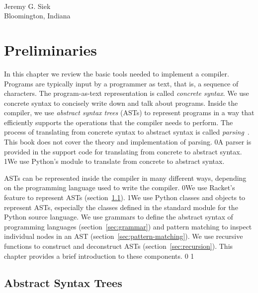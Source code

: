 \documentclass[7x10]{TimesAPriori_MIT}%
\def\racketEd{0}
\def\pythonEd{1}
\def\edition{0}
\newcommand{\racket}[1]{{\if\edition\racketEd{#1}\fi}}
\newcommand{\python}[1]{{\if\edition\pythonEd #1\fi}}
\numberwithin{theorem}{chapter}
\numberwithin{definition}{chapter}
\numberwithin{equation}{chapter}
\begin{document}
\mbox{}\\
\noindent Jeremy G. Siek \\
Bloomington, Indiana

\mainmatter

\chapter{Preliminaries}
\label{ch:trees-recur}
\setcounter{footnote}{0}

In this chapter we review the basic tools needed to implement a
compiler. Programs are typically input by a programmer as text, that
is, a sequence of characters. The program-as-text representation is
called \emph{concrete syntax}. We use concrete syntax to concisely
write down and talk about programs. Inside the compiler, we use
\emph{abstract syntax trees} (ASTs) to represent programs in a way
that efficiently supports the operations that the compiler needs to
perform.
The process of translating from concrete syntax to abstract syntax is
called \emph{parsing}~\citep{Aho:2006wb}. This book does not cover the
theory and implementation of parsing.
%
\racket{A parser is provided in the support code for translating from
  concrete to abstract syntax.}
%
\python{We use Python's  module to translate from concrete
  to abstract syntax.}

ASTs can be represented inside the compiler in many different ways,
depending on the programming language used to write the compiler.
%
\racket{We use Racket's
\href{https://docs.racket-lang.org/guide/define-struct.html}{\code{struct}}
feature to represent ASTs (section~\ref{sec:ast}).}
%
\python{We use Python classes and objects to represent ASTs, especially the
  classes defined in the standard \code{ast} module for the Python
  source language.}
%
We use grammars to define the abstract syntax of programming languages
(section~\ref{sec:grammar}) and pattern matching to inspect individual
nodes in an AST (section~\ref{sec:pattern-matching}).  We use
recursive functions to construct and deconstruct ASTs
(section~\ref{sec:recursion}).  This chapter provides a brief
introduction to these components.
\racket{}
\python{}

\section{Abstract Syntax Trees}
\label{sec:ast}
\end{document}
